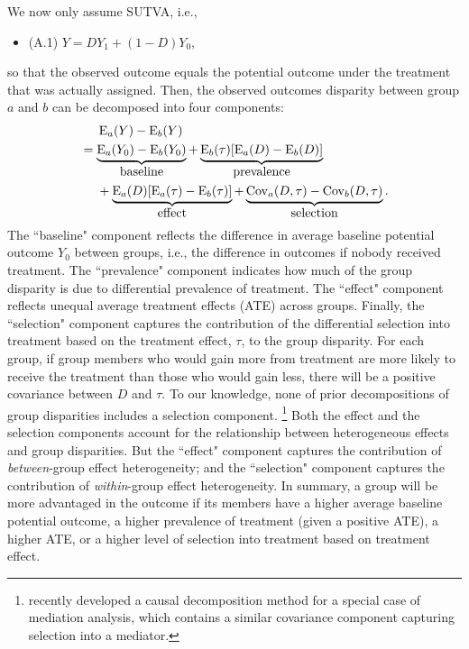 \documentclass[12pt,a4paper]{article}
\newcommand{\Cov}{\operatorname{Cov}}
\newcommand{\E}{\operatorname{E}}
\begin{document}
We now only assume SUTVA, i.e.,
\begin{itemize}
     \item[] (A.1) $Y=D Y_1 + (1-D) Y_0$,
\end{itemize}
so that the observed outcome equals the potential outcome under the treatment that was actually assigned.
Then, the observed outcomes disparity between group $a$ and $b$ can be decomposed into four components: 
\begin{align}
&\phantom{{}={}} \E_a(Y)-\E_b(Y)   \nonumber  \\
&= \underbrace{ \E_a(Y_{0})-\E_b(Y_{0}) }_{\text{\normalsize baseline}}
+ \underbrace{\E_b(\tau) [\E_a(D)-\E_b(D)]}_{\text{\normalsize prevalence}} \nonumber  \\ 
&\phantom{{}={}} + \underbrace{\E_a(D)[ \E_a(\tau) - \E_b(\tau) ]}_{\text{\normalsize effect}} 
+ \underbrace{\Cov_a(D, \tau) -  \Cov_b(D, \tau)}_{\text{\normalsize  selection}}. \label{eqt1}
\end{align}
The ``baseline" component reflects the difference in average baseline potential outcome $Y_0$ between groups, i.e., the difference in outcomes if nobody received treatment. The ``prevalence" component indicates how much of the group disparity is due to differential prevalence of treatment. The ``effect" component reflects unequal average treatment effects (ATE) across groups. Finally, the ``selection" component captures the contribution of the differential selection into treatment based on the treatment effect, $\tau$,  to the group disparity. 
For each group, if group members who would gain more from treatment are more likely to receive the treatment than those who would gain less, there will be a positive covariance between $D$ and $\tau$. To our knowledge, none of prior decompositions of group disparities includes a selection component. \footnote{\citet{zhou_attendance_2022} recently developed a causal decomposition method for a special case of mediation analysis, which contains a similar covariance component capturing selection into a mediator.} 
Both the effect and the selection components account for the relationship between heterogeneous effects and group disparities. But the ``effect" component captures the contribution of \emph{between}-group effect heterogeneity; and the ``selection" component captures the contribution of \emph{within}-group effect heterogeneity. In summary, a group will be more advantaged in the outcome if its members have a higher average baseline potential outcome, a higher prevalence of treatment (given a positive ATE), a higher ATE, or a higher level of selection into treatment based on treatment effect.
\end{document}
